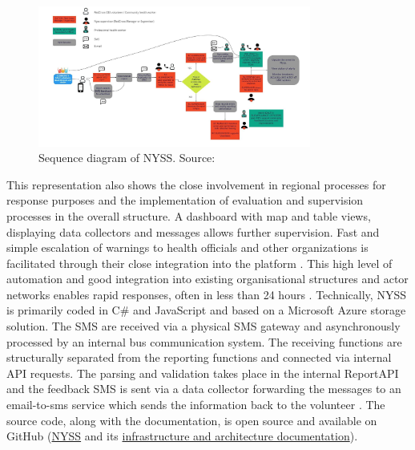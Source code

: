 \begin{figure}[!htp]
    \centering
    \includegraphics[width=0.8\textwidth]{figures/2023_MA_th_nyss_diagram.jpg}
    \decoRule
    \caption[Sequence diagram of NYSS]{Sequence diagram of NYSS. Source: \autocite{nrcWhatNyss2023}}
    \label{fig:th_nyss_diagram}
\end{figure}


This representation also shows the close involvement in regional processes for response purposes and the implementation of evaluation and supervision processes in the overall structure. A dashboard with map and table views, displaying data collectors and messages allows further supervision. Fast and simple escalation of warnings to health officials and other organizations is facilitated through their close integration into the platform \autocite{nrcNYSSCommunitybasedSurveillance2021,nrcWhatNyss2023}. This high level of automation and good integration into existing organisational structures and actor networks enables rapid responses, often in less than 24 hours \autocite{jungCommunityBasedSurveillance2022}.\newline
Technically, NYSS is primarily coded in C\# and JavaScript and based on a Microsoft Azure storage solution. The SMS are received via a physical SMS gateway and asynchronously processed by an internal bus communication system. The receiving functions are structurally separated from the reporting functions and connected via internal API requests. The parsing and validation takes place in the internal ReportAPI and the feedback SMS is sent via a data collector forwarding the messages to an email-to-sms service which sends the information back to the volunteer \autocite{nrcNyssToolDeveloped2023,nrcNYSSCommunitybasedSurveillance2021,nrcWhatNyss2023}. The source code, along with the documentation, is open source and available on GitHub (\href{https://github.com/nyss-platform-norcross/nyss}{NYSS} and its \href{https://github.com/nyss-platform-norcross/nyss/tree/master/Infrastructure}{infrastructure and architecture documentation}).

